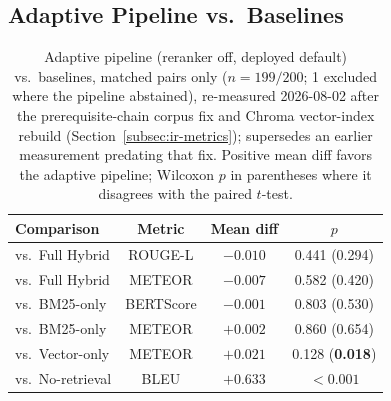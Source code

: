 \documentclass[a4paper,twoside]{article}
\begin{document}
\subsection{Adaptive Pipeline vs.\ Baselines}
\label{subsec:novel-vs-baselines}

\begin{table}[t]
\caption{Adaptive pipeline (reranker off, deployed default) vs.\ baselines, matched pairs only ($n=199/200$; 1 excluded where the pipeline abstained), re-measured 2026-08-02 after the prerequisite-chain corpus fix and Chroma vector-index rebuild (Section~\ref{subsec:ir-metrics}); supersedes an earlier measurement predating that fix. Positive mean diff favors the adaptive pipeline; Wilcoxon $p$ in parentheses where it disagrees with the paired $t$-test.}\label{tab:novel-sig} \centering
\begin{tabular}{|l|c|c|c|}
\hline
Comparison & Metric & Mean diff & $p$ \\
\hline
vs.\ Full Hybrid & ROUGE-L & $-0.010$ & 0.441 (0.294) \\
vs.\ Full Hybrid & METEOR & $-0.007$ & 0.582 (0.420) \\
vs.\ BM25-only & BERTScore & $-0.001$ & 0.803 (0.530) \\
vs.\ BM25-only & METEOR & $+0.002$ & 0.860 (0.654) \\
vs.\ Vector-only & METEOR & $+0.021$ & 0.128 (\textbf{0.018}) \\
vs.\ No-retrieval & BLEU & $+0.633$ & $<0.001$ \\
\hline
\end{tabular}
\end{table}
\end{document}

